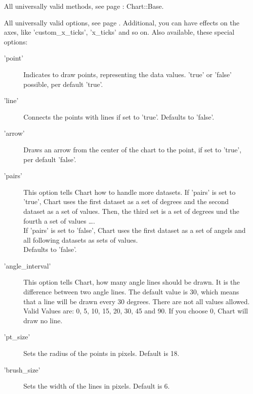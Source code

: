 \Methods
All universally valid methods, see page \pageref{methods}: Chart::Base.

\Attributes
All universally valid options, see page \pageref{options}.
Additional, you can have effects on the axes, like 'custom\_x\_ticks', 'x\_ticks' and so on. 
Also available, these special options:
\begin{description}
\item['point'] Indicates to draw points, 
               representing the data values. 
               'true' or 'false' possible, per default 'true'.

\item['line'] Connects the points with lines if set to 'true'. 
              Defaults to 'false'.

\item['arrow'] Draws an arrow from the center of the chart to the point, 
               if set to 'true', per default 'false'.

\item['pairs'] This option tells Chart how to handle more datasets. 
               If 'pairs' is set to 'true', 
               Chart uses the first dataset as a set of degrees and 
               the second dataset as a set of values. 
               Then, the third set is a set of degrees und the fourth a set of values \dots. \\
               If 'pairs' is set to 'false', 
               Chart uses the first dataset as a set of angels 
               and all following datasets as sets of values. \\
               Defaults to 'false'.
               
\item['angle\_interval'] This option tells Chart, how many angle lines should be drawn. 
                         It is the difference between two angle lines. 
                         The default value is 30, which means 
                         that a line will be drawn every 30 degrees. 
                         There are not all values allowed. 
                         Valid Values are: 0, 5, 10, 15, 20, 30, 45 and 90. 
                         If you choose 0, Chart will draw no line.
                         
\item['pt\_size']Sets the radius of the points in pixels. Default is 18.

\item['brush\_size']Sets the width of the lines in pixels. Default is 6.


\end{description}
